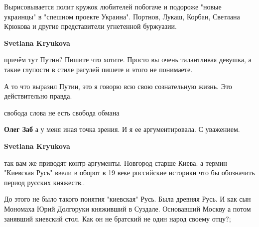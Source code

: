 \begin{itemize}
\begin{itemize}
Вырисовывается полит кружок любителей побогаче и подороже "новые украинцы" в
"спешном проекте Украина". Портнов, Лукаш, Корбан, Светлана Крюкова и другие
представители угнетенной буржуазии. \Smiley[1.0][yellow] \Smiley[1.0][yellow]

 
\textbf{Svetlana Kryukova} 

причём тут Путин? Пишите что хотите. Просто вы очень
талантливая девушка, а такие глупости в стиле рагулей пишете и этого не
понимаете. 

А то что выразил Путин, это я говорю всю свою сознательную жизнь.
Это действительно правда.

 
свобода слова не есть свобода обмана


 
\textbf{Олег Заб} а у меня иная точка зрения. И я ее аргументировала. С уважением.

 
\textbf{Svetlana Kryukova} 

так вам же приводят контр-аргументы. Новгород старше Киева. а термин "Киевская
Русь" ввели в оборот в 19 веке российские историки что бы обозначить период
русских княжеств.. 

До этого не было такого понятия "киевская" Русь. Была древняя Русь. И как сын
Мономаха Юрий Долгоруки княживший в Суздале. Основавший Москву а потом занявший
киевский стол. Как он не братский не один народ своему отцу?;

 

\end{itemize}
\end{itemize}
